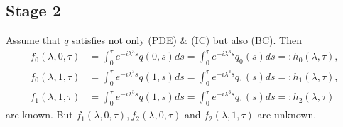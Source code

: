 \subsection*{Stage 2}
Assume that $q$ satisfies not only (PDE) \& (IC) but also (BC). Then
\begin{align*}
    f_0(\lambda, 0, \tau) &= \int_0^{\tau} e^{-i\lambda^3s}q(0,s)ds = \int_0^{\tau} e^{-i\lambda^3s}q_0(s) ds =: h_0(\lambda,\tau),\\
    f_0(\lambda, 1, \tau) &= \int_0^{\tau} e^{-i\lambda^3s}q(1,s)ds = \int_0^{\tau} e^{-i\lambda^3s}q_1(s) ds =: h_1(\lambda,\tau), \\
    f_1(\lambda, 1, \tau) &= \int_0^{\tau} e^{-i\lambda^3s}q(1,s)ds = \int_0^{\tau} e^{-i\lambda^3s}q_1(s) ds =: h_2(\lambda,\tau)
\end{align*}
are known. But $f_1(\lambda,0,\tau), f_2(\lambda,0,\tau)$ and $f_2(\lambda,1,\tau)$ are unknown.

